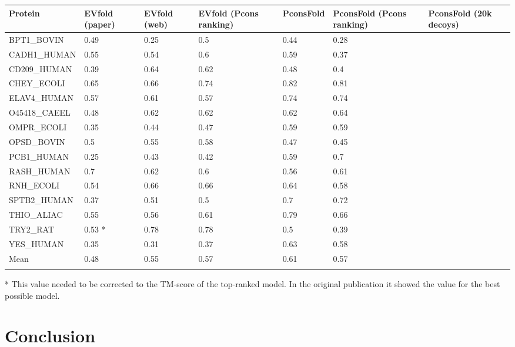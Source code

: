 \documentclass{bioinfo}
\begin{document}
\begin{table}[!t]
{\begin{tabular}{lllllll}\toprule
Protein & EVfold (paper) & EVfold (web) & EVfold (Pcons ranking) & PconsFold & PconsFold (Pcons ranking) & PconsFold (20k decoys)\\\midrule
BPT1\_BOVIN & 0.49 & 0.25 & 0.5 & 0.44 & 0.28 & ~ \\
CADH1\_HUMAN & 0.55 & 0.54 & 0.6 & 0.59 & 0.37& ~ \\
CD209\_HUMAN & 0.39 & 0.64 & 0.62 & 0.48 & 0.4& ~ \\
CHEY\_ECOLI & 0.65 & 0.66 & 0.74 & 0.82 &  0.81& ~ \\
ELAV4\_HUMAN & 0.57 & 0.61 & 0.57 & 0.74 & 0.74& ~ \\
O45418\_CAEEL & 0.48 & 0.62 & 0.62 & 0.62 & 0.64& ~ \\
OMPR\_ECOLI & 0.35 & 0.44 & 0.47 & 0.59 & 0.59& ~ \\
OPSD\_BOVIN & 0.5 & 0.55 & 0.58 & 0.47 & 0.45& ~ \\
PCB1\_HUMAN & 0.25 & 0.43 & 0.42 & 0.59 & 0.7& ~ \\
RASH\_HUMAN & 0.7 & 0.62 & 0.6 & 0.56 & 0.61& ~ \\
RNH\_ECOLI & 0.54 & 0.66 & 0.66 & 0.64 & 0.58& ~ \\
SPTB2\_HUMAN & 0.37 & 0.51 & 0.5 & 0.7 & 0.72& ~ \\
THIO\_ALIAC & 0.55 & 0.56 & 0.61 & 0.79 & 0.66& ~ \\
TRY2\_RAT & 0.53 * & 0.78 & 0.78 & 0.5 & 0.39& ~ \\
YES\_HUMAN & 0.35 & 0.31 & 0.37 & 0.63 & 0.58& ~ \\ \midrule
Mean & 0.48 & 0.55 & 0.57 & 0.61 & 0.57& ~ \\ \botrule
\end{tabular}}{* This value needed to be corrected to the TM-score of the top-ranked model. In the original publication it showed the value for the best possible model.}
\end{table}

\section{Conclusion}
\end{document}

